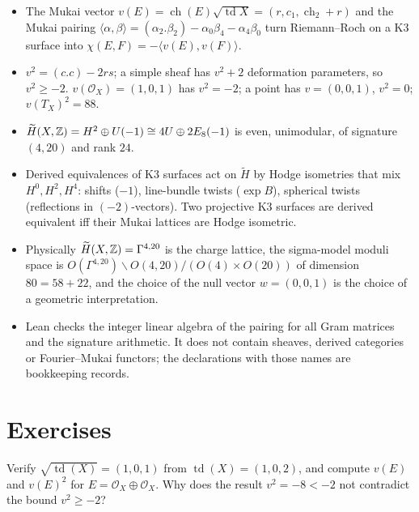 \begin{summarybox}
\begin{itemize}[leftmargin=*]
\item The Mukai vector $v(E)=\operatorname{ch}(E)\sqrt{\operatorname{td}X}=(r,c_1,
  \operatorname{ch}_2+r)$ and the Mukai pairing
  $\langle\alpha,\beta\rangle=(\alpha_2.\beta_2)-\alpha_0\beta_4-\alpha_4\beta_0$ turn
  Riemann--Roch on a K3 surface into $\chi(E,F)=-\langle v(E),v(F)\rangle$.
\item $v^2=(c.c)-2rs$; a simple sheaf has $v^2+2$ deformation parameters, so $v^2\ge-2$.
  $v(\mathcal O_X)=(1,0,1)$ has $v^2=-2$; a point has $v=(0,0,1)$, $v^2=0$; $v(T_X)^2=88$.
\item $\widetilde H(X,\mathbb{Z})=H^2\oplus U(-1)\cong4U\oplus2E_8(-1)$ is even, unimodular, of signature
  $(4,20)$ and rank $24$.
\item Derived equivalences of K3 surfaces act on $\widetilde H$ by Hodge isometries that mix
  $H^0,H^2,H^4$: shifts ($-1$), line-bundle twists ($\exp B$), spherical twists (reflections in
  $(-2)$-vectors). Two projective K3 surfaces are derived equivalent iff their Mukai lattices are
  Hodge isometric.
\item Physically $\widetilde H(X,\mathbb{Z})=\Gamma^{4,20}$ is the charge lattice, the sigma-model moduli
  space is $O(\Gamma^{4,20})\backslash O(4,20)/(O(4)\times O(20))$ of dimension $80=58+22$, and
  the choice of the null vector $w=(0,0,1)$ is the choice of a geometric interpretation.
\item Lean checks the integer linear algebra of the pairing for all Gram matrices and the
  signature arithmetic. It does not contain sheaves, derived categories or Fourier--Mukai
  functors; the declarations with those names are bookkeeping records.
\end{itemize}
\end{summarybox}

\section*{Exercises}

\begin{exercise}[$\star$]\label{exo:mukai:todd}
Verify $\sqrt{\operatorname{td}(X)}=(1,0,1)$ from $\operatorname{td}(X)=(1,0,2)$, and compute
$v(E)$ and $v(E)^2$ for $E=\mathcal O_X\oplus\mathcal O_X$. Why does the result $v^2=-8<-2$ not
contradict the bound $v^2\ge-2$?
\end{exercise}

